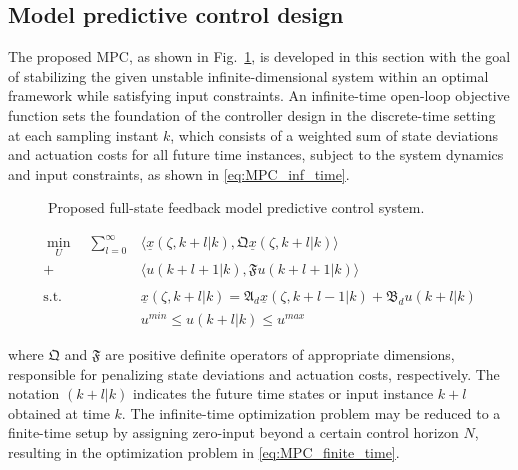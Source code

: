 \subsection{Model predictive control design}

The proposed MPC, as shown in Fig.~\ref{fig:block_diagram}, is developed in this section with the goal of stabilizing the given unstable infinite-dimensional system within an optimal framework while satisfying input constraints. An infinite-time open-loop objective function sets the foundation of the controller design in the discrete-time setting at each sampling instant $k$, which consists of a weighted sum of state deviations and actuation costs for all future time instances, subject to the system dynamics and input constraints, as shown in \eqref{eq:MPC_inf_time}.

\begin{figure}[!htbp]
    \centering
    \caption{Proposed full-state feedback model predictive control system.}
    \label{fig:block_diagram}
\end{figure}

\begin{equation} \label{eq:MPC_inf_time}
    \begin{aligned}
        \min_{U} \quad \sum_{l=0}^{\infty} &\langle \underline{x}(\zeta, k+l | k), \mathfrak{Q} \underline{x}(\zeta, k+l | k) \rangle \\
        + &\langle u(k+l+1 | k), \mathfrak{F} u(k+l+1|k) \rangle \\
        \, \\
        \text{s.t.} \quad &\underline{x}(\zeta, k+l | k) = \mathfrak{A}_d \underline{x}(\zeta, k+l-1 | k) + \mathfrak{B}_d u(k+l | k) \\
        &u^{min} \leq u(k+l | k) \leq u^{max}
    \end{aligned}
\end{equation}

where $\mathfrak{Q}$ and $\mathfrak{F}$ are positive definite operators of appropriate dimensions, responsible for penalizing state deviations and actuation costs, respectively. The notation $(k+l|k)$ indicates the future time states or input instance $k+l$ obtained at time $k$. The infinite-time optimization problem may be reduced to a finite-time setup by assigning zero-input beyond a certain control horizon $N$, resulting in the optimization problem in \eqref{eq:MPC_finite_time}.

